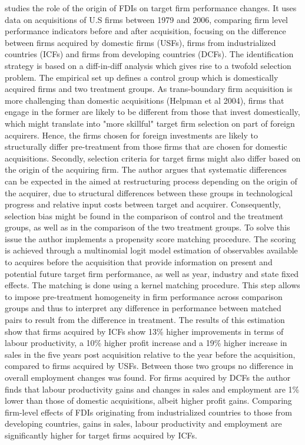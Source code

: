\documentclass[11pt,a4paper,leqno]{article}
\begin{document}
\cite{chen2011} studies the role of the origin of FDIs on target firm performance changes. It uses data on acquisitions of U.S firms between 1979 and 2006, comparing firm level performance indicators before and after acquisition, focusing on the difference between firms acquired by domestic firms (USFs), firms from industrialized countries (ICFs) and firms from developing countries (DCFs). The identification strategy is based on a diff-in-diff analysis which gives rise to a twofold selection problem. The empirical set up defines a control group which is domestically acquired firms and two treatment groups. As trans-boundary firm acquisition is more challenging than domestic acquisitions (Helpman et al 2004), firms that engage in the former are likely to be different from those that invest domestically, which might translate into "more skillful" target firm selection on part of foreign acquirers. Hence, the firms chosen for foreign investments are likely to structurally differ pre-treatment from those firms that are chosen for domestic acquisitions. Secondly, selection criteria for target firms might also differ based on the origin of the acquiring firm. The author argues that systematic differences can be expected in the aimed at restructuring process depending on the origin of the acquirer, due to structural differences between these groups in technological progress and relative input costs between target and acquirer. Consequently, selection bias might be found in the comparison of control and the treatment groups, as well as in the comparison of the two treatment groups. To solve this issue the author implements a propensity score matching procedure. The scoring is achieved through a multinomial logit model estimation of observables available to acquires before the acquisition that provide information on present and potential future target firm performance, as well as year, industry and state fixed effects. The matching is done using a kernel matching procedure. This step allows to impose pre-treatment homogeneity in firm performance across comparison groups and thus to interpret any difference in performance between matched pairs to result from the difference in treatment. The results of this estimation show that firms acquired by ICFs show 13\% higher improvements in terms of labour productivity, a 10\% higher profit increase and a 19\% higher increase in sales in the five years post acquisition relative to the year before the acquisition, compared to firms acquired by USFs. Between those two groups no difference in overall employment changes was found. For firms acquired by DCFs the author finds that labour productivity gains and changes in sales and employment are 1\% lower than those of domestic acquisitions, albeit higher profit gains. Comparing firm-level effects of FDIs originating from industrialized countries to those from developing countries, gains in sales, labour productivity and employment are significantly higher for target firms acquired by ICFs.
\end{document}
